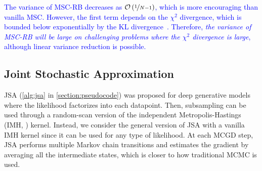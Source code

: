 

\textcolor{blue}{
The variance of MSC-RB decreases as \(\mathcal{O}\left(\nicefrac{1}{N-1}\right)\), which is more encouraging than vanilla MSC.
However, the first term depends on the \(\chi^2\) divergence, which is bounded below exponentially by the KL divergence~\citep{10.1214/17-STS611}.
Therefore, \textit{the variance of MSC-RB will be large on challenging problems where the \(\chi^2\) divergence is large}, although linear variance reduction is possible.
}

\vspace{-0.1in}
\subsection{Joint Stochastic Approximation}
\vspace{-0.1in}
JSA (\cref{alg:jsa} in \cref{section:pseudocode}) was proposed for deep generative models where the likelihood factorizes into each datapoint.
Then, subsampling can be used through a random-scan version of the independent Metropolis-Hastings (IMH, \citealt{hastings_monte_1970}) kernel.
Instead, we consider the general version of JSA with a vanilla IMH kernel since it can be used for any type of likelihood.
At each MCGD step, JSA performs multiple Markov chain transitions and estimates the gradient by averaging all the intermediate states, which is closer to how traditional MCMC is used.

\vspace{-0.1in}
